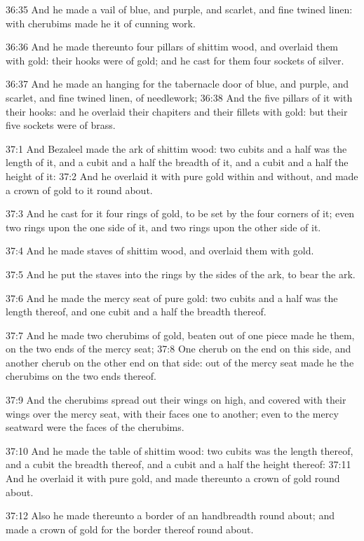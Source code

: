 36:35 And he made a vail of blue, and purple, and scarlet, and fine twined linen: with cherubims made he it of cunning work.

36:36 And he made thereunto four pillars of shittim wood, and overlaid them with gold: their hooks were of gold; and he cast for them four sockets of silver.

36:37 And he made an hanging for the tabernacle door of blue, and purple, and scarlet, and fine twined linen, of needlework; 36:38 And the five pillars of it with their hooks: and he overlaid their chapiters and their fillets with gold: but their five sockets were of brass.

37:1 And Bezaleel made the ark of shittim wood: two cubits and a half was the length of it, and a cubit and a half the breadth of it, and a cubit and a half the height of it: 37:2 And he overlaid it with pure gold within and without, and made a crown of gold to it round about.

37:3 And he cast for it four rings of gold, to be set by the four corners of it; even two rings upon the one side of it, and two rings upon the other side of it.

37:4 And he made staves of shittim wood, and overlaid them with gold.

37:5 And he put the staves into the rings by the sides of the ark, to bear the ark.

37:6 And he made the mercy seat of pure gold: two cubits and a half was the length thereof, and one cubit and a half the breadth thereof.

37:7 And he made two cherubims of gold, beaten out of one piece made he them, on the two ends of the mercy seat; 37:8 One cherub on the end on this side, and another cherub on the other end on that side: out of the mercy seat made he the cherubims on the two ends thereof.

37:9 And the cherubims spread out their wings on high, and covered with their wings over the mercy seat, with their faces one to another; even to the mercy seatward were the faces of the cherubims.

37:10 And he made the table of shittim wood: two cubits was the length thereof, and a cubit the breadth thereof, and a cubit and a half the height thereof: 37:11 And he overlaid it with pure gold, and made thereunto a crown of gold round about.

37:12 Also he made thereunto a border of an handbreadth round about; and made a crown of gold for the border thereof round about.

